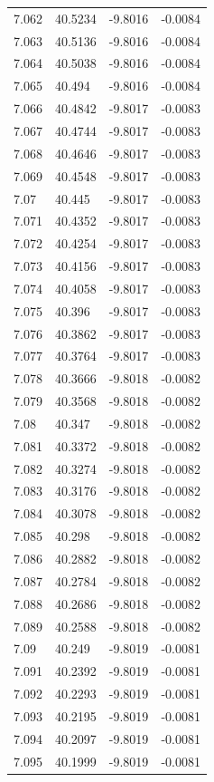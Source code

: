 \begin{tabular}{llll}
7.062 & 40.5234 & -9.8016 & -0.0084 \\
7.063 & 40.5136 & -9.8016 & -0.0084 \\
7.064 & 40.5038 & -9.8016 & -0.0084 \\
7.065 & 40.494 & -9.8016 & -0.0084 \\
7.066 & 40.4842 & -9.8017 & -0.0083 \\
7.067 & 40.4744 & -9.8017 & -0.0083 \\
7.068 & 40.4646 & -9.8017 & -0.0083 \\
7.069 & 40.4548 & -9.8017 & -0.0083 \\
7.07 & 40.445 & -9.8017 & -0.0083 \\
7.071 & 40.4352 & -9.8017 & -0.0083 \\
7.072 & 40.4254 & -9.8017 & -0.0083 \\
7.073 & 40.4156 & -9.8017 & -0.0083 \\
7.074 & 40.4058 & -9.8017 & -0.0083 \\
7.075 & 40.396 & -9.8017 & -0.0083 \\
7.076 & 40.3862 & -9.8017 & -0.0083 \\
7.077 & 40.3764 & -9.8017 & -0.0083 \\
7.078 & 40.3666 & -9.8018 & -0.0082 \\
7.079 & 40.3568 & -9.8018 & -0.0082 \\
7.08 & 40.347 & -9.8018 & -0.0082 \\
7.081 & 40.3372 & -9.8018 & -0.0082 \\
7.082 & 40.3274 & -9.8018 & -0.0082 \\
7.083 & 40.3176 & -9.8018 & -0.0082 \\
7.084 & 40.3078 & -9.8018 & -0.0082 \\
7.085 & 40.298 & -9.8018 & -0.0082 \\
7.086 & 40.2882 & -9.8018 & -0.0082 \\
7.087 & 40.2784 & -9.8018 & -0.0082 \\
7.088 & 40.2686 & -9.8018 & -0.0082 \\
7.089 & 40.2588 & -9.8018 & -0.0082 \\
7.09 & 40.249 & -9.8019 & -0.0081 \\
7.091 & 40.2392 & -9.8019 & -0.0081 \\
7.092 & 40.2293 & -9.8019 & -0.0081 \\
7.093 & 40.2195 & -9.8019 & -0.0081 \\
7.094 & 40.2097 & -9.8019 & -0.0081 \\
7.095 & 40.1999 & -9.8019 & -0.0081 \\

\end{tabular}
